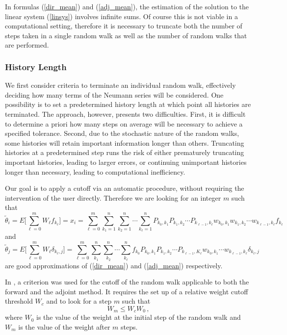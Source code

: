 In formulas (\ref{dir_mean}) and (\ref{adj_mean}), the estimation of the
solution to
the linear system (\ref{linsys}) involves infinite sums. Of course this is
not viable in a computational setting,
therefore it is necessary to truncate both the number of steps taken in
a single random walk as well as the number of random walks that
are performed.

\subsubsection{History Length}

We first consider criteria to terminate an individual random walk, effectively
deciding how many terms of the Neumann series will be considered.
One possibility is to set a predetermined history length at which point all
histories are terminated.  The approach, however, presents two difficulties.
First, it is difficult to determine a priori how many steps on average will be
necessary to achieve a specified tolerance.  Second, due to the stochastic
nature of the random walks, some histories will retain important information
longer than others.  Truncating histories at a predetermined step runs the
risk of either prematurely truncating important histories, leading to larger
errors, or continuing unimportant histories longer than necessary,
leading to computational inefficiency.

Our goal is to apply a cutoff via an automatic procedure, without requiring
the intervention of the user directly.
Therefore we are looking for an integer $m$ such that
\[
\tilde{\theta}_i=E\bigg[\sum_{\ell=0}^m W_{\ell}
f_{k_{\ell}}\bigg]=x_i=\sum_{\ell=0}^m
\sum_{k_1=1}^{n}\sum_{k_2=1}^n\cdots \sum_{k_{\ell}=1}^n
P_{k_0,k_1}P_{k_1,k_2}\cdots P_{k_{\ell-1},
k_{\ell}}w_{k_0,k_1}w_{k_1,k_2}\cdots
w_{k_{\ell-1}, k_{\ell}}f_{k_{\ell}}
\]
and
\[
\tilde{\theta}_j=E\bigg[\sum_{\ell=0}^m W_{\ell}\delta_{k_{\ell},
j}\bigg]=\sum_{\ell=0}^{m}\sum_{k_1}^n\sum_{k_2}^n\cdots\sum_{k_{\ell}}^n
f_{k_0}P_{k_0,k_1}P_{k_1,k_2}\cdots P_{k_{\ell-1},K_{\ell}}w_{k_0,k_1}\cdots
w_{k_{\ell-1},k_{\ell}}\delta_{k_{\ell},j}
\]
are good approximations of (\ref{dir_mean}) and (\ref{adj_mean}) respectively.

In \cite{Slattery2013}, a criterion was used for the cutoff of the random walk
applicable to both the forward and the adjoint method. It requires the set up
of a relative weight cutoff threshold $W_c$ and to look for a step $m$ such that
\begin{equation}
W_m \le W_c W_0 \,,
\label{cutoff}
\end{equation}
where $W_0$ is the value of the weight at the initial step of the random walk
and $W_m$ is the value of the weight after $m$ steps.

